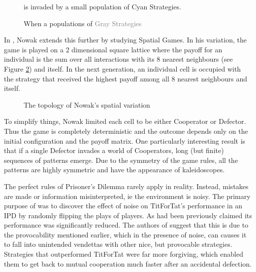 \begin{figure}[tb]
    \centering
    
    \caption{When a populations of \textcolor{gray}{Gray Strategies}} is invaded by a small population of \textcolor{sol-cyan}{Cyan Strategies}.
    \label{fig:evol_stable}
\end{figure}

In \cite{Nowak1992, Nowak1993, Nowak1994}, Nowak extends this further by studying Spatial Games.
In his variation, the game is played on a 2 dimensional square lattice where the payoff for an individual is the sum over all interactions with its 8 nearest neighbours (see Figure \ref{fig:nowak_spatial}) and itself.
In the next generation, an individual cell is occupied with the strategy that received the highest payoff among all 8 nearest neighbours and itself.

\begin{figure}[hbtp!]
    \centering
    \caption{The topology of Nowak's spatial variation}
    \label{fig:nowak_spatial}
\end{figure}

To simplify things, Nowak limited each cell to be either Cooperator or Defector.
Thus the game is completely deterministic and the outcome depends only on the initial configuration and the payoff matrix.
One particularly interesting result is that if a single Defector invades a world of Cooperators, long (but finite) sequences of patterns emerge.
Due to the symmetry of the game rules, all the patterns are highly symmetric and have the appearance of kaleidoscopes.

The perfect rules of Prisoner's Dilemma rarely apply in reality.
Instead, mistakes are made or information misinterpreted, ie the environment is noisy.
The primary purpose of \cite{Bendor1991} was to discover the effect of noise on TitForTat's performance in an IPD by randomly flipping the plays of players.
As had been previously claimed its performance was significantly reduced.
The authors of \cite{Bendor1991} suggest that this is due to the provocability mentioned earlier, which in the presence of noise, can causes it to fall into unintended vendettas with other nice, but provocable strategies.
Strategies that outperformed TitForTat were far more forgiving, which enabled them to get back to mutual cooperation much faster after an accidental defection.



